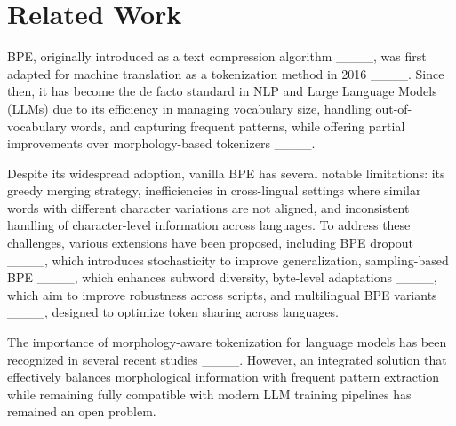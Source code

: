\section{Related Work}
BPE, originally introduced as a text compression algorithm ____, was first adapted for machine translation as a tokenization method in 2016 ____. Since then, it has become the de facto standard in NLP and Large Language Models (LLMs) due to its efficiency in managing vocabulary size, handling out-of-vocabulary words, and capturing frequent patterns, while offering partial improvements over morphology-based tokenizers ____.  

Despite its widespread adoption, vanilla BPE has several notable limitations: its greedy merging strategy, inefficiencies in cross-lingual settings where similar words with different character variations are not aligned, and inconsistent handling of character-level information across languages. To address these challenges, various extensions have been proposed, including BPE dropout ____, which introduces stochasticity to improve generalization, sampling-based BPE ____, which enhances subword diversity, byte-level adaptations ____, which aim to improve robustness across scripts, and multilingual BPE variants ____, designed to optimize token sharing across languages.  

The importance of morphology-aware tokenization for language models has been recognized in several recent studies ____. However, an integrated solution that effectively balances morphological information with frequent pattern extraction while remaining fully compatible with modern LLM training pipelines has remained an open problem.